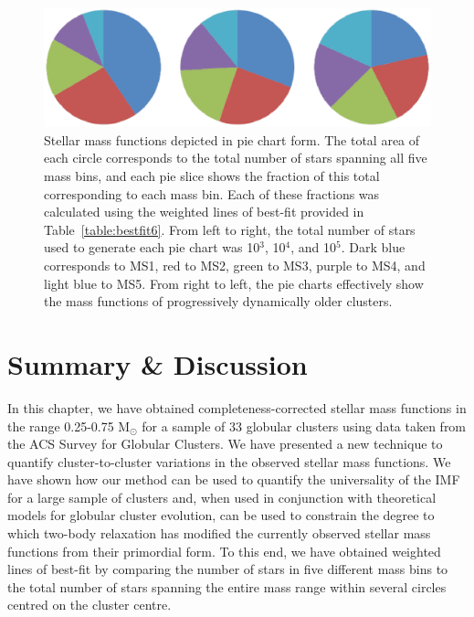 \begin{figure} [!h]
  \begin{center}
 \includegraphics[scale=0.5]{Chapter-6/pie_charts.ps}
    \caption[Mass Functions in Pie Chart Form]{
      Stellar mass functions depicted in pie chart form.  The total
      area of each circle corresponds to the total number of stars
      spanning all five mass bins, and each pie slice shows the
      fraction of this total corresponding to each mass bin.  Each of
      these fractions was calculated using the weighted lines of
      best-fit provided in Table~\ref{table:bestfit6}.  From left to
      right, the total number of stars used to generate each pie chart
      was 10$^3$, 10$^4$, and 10$^5$.  Dark blue corresponds to MS1,
      red to MS2, green to MS3, purple to MS4, and light blue to MS5.
      From right to left, the pie charts effectively show the mass functions of
      progressively dynamically older clusters.
      \label{fig:pie_charts}}
    \end{center}
\end{figure}

\section{Summary \& Discussion} \label{discussion6}

In this chapter, we have obtained completeness-corrected stellar mass
functions in the range 0.25-0.75 M$_{\odot}$ for a sample of 33
globular clusters using data taken from the ACS Survey for Globular
Clusters.  We have presented a new technique to quantify
cluster-to-cluster variations in the observed stellar mass functions.  
We have shown how our method can be used to quantify the universality
of the IMF for a large sample of clusters and, when used in
conjunction with theoretical models for globular cluster evolution,
can be used to constrain the degree to which two-body relaxation has
modified the currently observed stellar mass functions from their 
primordial form.  To this end, we have
obtained weighted lines of best-fit by comparing the number of stars in five
different mass bins to the total number of stars spanning the
entire mass range within several circles centred on the cluster
centre.  

